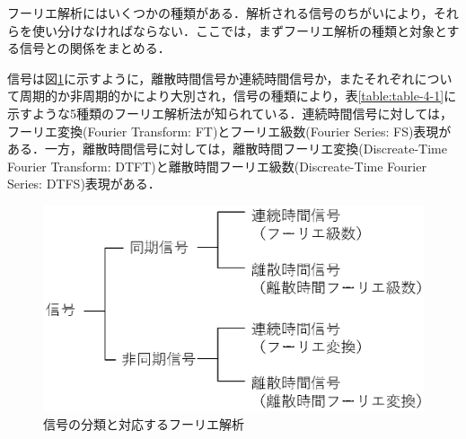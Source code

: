 フーリエ解析にはいくつかの種類がある．解析される信号のちがいにより，それらを使い分けなければならない．ここでは，まずフーリエ解析の種類と対象とする信号との関係をまとめる．

信号は図\ref{fig:zu_4-2}に示すように，離散時間信号か連続時間信号か，またそれぞれについて周期的か非周期的かにより大別され，信号の種類により，表\ref{table:table-4-1}に示すような5種類のフーリエ解析法が知られている．連続時間信号に対しては，フーリエ変換(Fourier Transform: FT)とフーリエ級数(Fourier Series: FS)表現がある．一方，離散時間信号に対しては，離散時間フーリエ変換(Discreate-Time Fourier Transform: DTFT)と離散時間フーリエ級数(Discreate-Time Fourier Series: DTFS)表現がある．

\begin{figure}[H]
\begin{center}
\includegraphics[width=.7\textwidth]{fig/fig-4-2.eps}
\end{center}
\caption{信号の分類と対応するフーリエ解析}
\label{fig:zu_4-2}
\end{figure}


